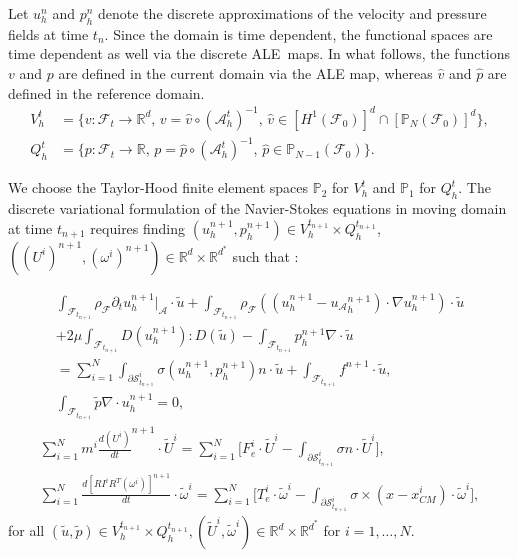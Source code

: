 \documentclass[graybox]{svmult}
\newcommand{\Fluid}{\mathcal{F}} %
\newcommand{\Alemap}{\mathcal{A}} %
\newcommand{\ALE}{ALE} %
\newcommand{\Vel}{u} %
\newcommand{\Pres}{p} %
\newcommand{\tvel}{U} %
\newcommand{\angvel}{\omega} %
\newcommand{\CenterMassi}{x_{CM}^i}
\newcommand{\Solid}{\mathcal{S}} %
\newcommand{\normal}{n} %
\newcommand{\CompDomain}{\Fluid}
\begin{document}
Let $\Vel_h^n$ and $\Pres_h^n$ denote the discrete approximations of the velocity and pressure fields at time $t_n$. Since the domain is time dependent, the functional spaces are time dependent as well via the discrete \ALE\ maps. In what follows, the functions $v$ and $p$ are defined in the current domain via the ALE map, whereas $\hat{v}$ and $\hat{p}$ are defined in the reference domain.
\begin{equation}
	\begin{aligned}
		V_h^t &= \{v: \CompDomain_t \to \mathbb{R}^d, \, v = \hat{v} \circ (\mathcal{A}_h^t)^{-1}, \, \hat{v} \in [H^1(\CompDomain_0)]^d \cap [\mathbb{P}_N(\CompDomain_0)]^d  \}, \\
		Q_h^t &= \{\Pres : \CompDomain_t \to \mathbb{R}, \, \Pres = \hat{\Pres} \circ (\Alemap_h^t)^{-1}, \, \hat{\Pres} \in\mathbb{P}_{N-1}(\CompDomain_0) \}.
	\end{aligned}
	\label{Eq:FEMspace}
\end{equation}

We choose the Taylor-Hood finite element spaces $\mathbb{P}_{2}$ for $V_h^t$ and $\mathbb{P}_{1}$ for $Q_h^t$. The discrete variational formulation of the Navier-Stokes equations in moving domain at time $t_{n+1}$ requires finding $(\Vel_h^{n+1}, \Pres_h^{n+1}) \in V_h^{t_{n+1}} \times Q_h^{t_{n+1}}$, $((\tvel^i)^{n+1},(\angvel^i)^{n+1})\in \mathbb{R}^d\times \mathbb{R}^{d^*}$ such that : 

\color{blue}
\begin{eqnarray*}
\int_{\CompDomain_{t_{n+1}}} \rho_\Fluid \partial_t \Vel_h^{n+1}|_\Alemap  \cdot \tilde{\Vel} + \int_{\CompDomain_{t_{n+1}}} \rho_\Fluid ((\Vel_h^{n+1}-{\Vel_{\mathcal{A}}}_h^{n+1} )\cdot \nabla u_h^{n+1}) \cdot \tilde{\Vel}
 \\+ 2\mu \int_{\CompDomain_{t_{n+1}}} D(\Vel_h^{n+1}) : D( \tilde{\Vel}) -  \int_{\CompDomain_{t_{n+1}}} \Pres_h^{n+1} \nabla \cdot \tilde{\Vel} \\
 = \sum_{i=1}^N \int_{\partial \Solid_{t_{n+1}}^i} \sigma(\Vel_h^{n+1},\Pres_h^{n+1}) n \cdot \tilde{\Vel}
 + \int_{\CompDomain_{t_{n+1}}} f^{n+1} \cdot \tilde{\Vel},\\
 	\int_{\CompDomain_{t_{n+1}}} \tilde{\Pres} \nabla \cdot \Vel_h^{n+1} = 0,
  \end{eqnarray*}
  \begin{eqnarray*}
  \sum_{i=1}^N m^i \frac{d (\tvel^i)}{dt}^{n+1}\cdot \tilde{\tvel}^i = \sum_{i=1}^N \bigl[ F_e^i \cdot \tilde{\tvel}^i - \int_{\partial \Solid^i_{t_{n+1}}} \sigma \normal \cdot \tilde{\tvel}^i \bigr] ,
  \\ \sum_{i=1}^N \frac{d[R I^i R^T (\angvel^i)]^{n+1}}{dt} \cdot \tilde{\angvel}^i = \sum_{i=1}^N  \bigl[ T_e^i \cdot \tilde{\angvel}^i  -\int_{\partial \Solid^i_{t_{n+1}}} \sigma \times (x-\CenterMassi) \cdot  \tilde{\angvel}^i \bigr],
\label{Eq:discrete-var_form}
\end{eqnarray*}
for all $(\tilde{\Vel},\tilde{\Pres}) \in V_{h}^{t_{n+1}} \times Q_h^{t_{n+1}}, (\tilde{\tvel}^i,\tilde{\angvel}^i) \in \mathbb{R}^d\times \mathbb{R}^{d^*}$ for $i=1,\dots,N$.
\end{document}
